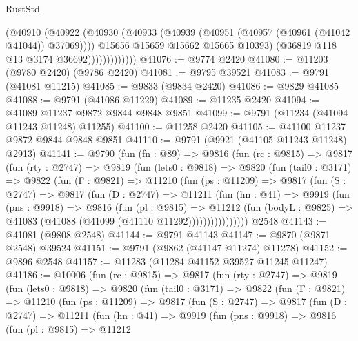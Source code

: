 \begin{lexlean}{RustStd}
\begin{coremodule}
                        (@40910
                          (@40922
                            (@40930
                              (@40933 (@40939 (@40951 (@40957 (@40961 (@41042 @41044)) @37069))))
                              @15656
                              @15659
                              @15662
                              @15665
                              @10393)
                            (@36819 @118 @13 @3174 @36692)))))))))))))
@41076 := @9774 @2420
@41080 := @11203 (@9780 @2420) (@9786 @2420)
@41081 := @9795 @39521
@41083 := @9791 (@41081 @11215)
@41085 := @9833 (@9834 @2420)
@41086 := @9829 @41085
@41088 := @9791 (@41086 @11229)
@41089 := @11235 @2420
@41094 := @41089 @11237 @9872 @9844 @9848 @9851
@41099 := @9791 (@11234 (@41094 @11243 @11248) @11255)
@41100 := @11258 @2420
@41105 := @41100 @11237 @9872 @9844 @9848 @9851
@41110 := @9791 (@9921 (@41105 @11243 @11248) @2913)
@41141 := @9790
    (fun (fn : @89) =>
    @9816
      (fun (rc : @9815) =>
      @9817
        (fun (rty : @2747) =>
        @9819
          (fun (lets0 : @9818) =>
          @9820
            (fun (tail0 : @3171) =>
            @9822
              (fun (Γ : @9821) =>
              @11210
                (fun (ps : @11209) =>
                @9817
                  (fun (S : @2747) =>
                  @9817
                    (fun (D : @2747) =>
                    @11211
                      (fun (hn : @41) =>
                      @9919
                        (fun (pns : @9918) =>
                        @9816
                          (fun (pl : @9815) =>
                          @11212
                            (fun (bodyL : @9825) =>
                            @41083 (@41088 (@41099 (@41110 @11292))))))))))))))))
    @2548
@41143 := @41081 (@9808 @2548)
@41144 := @9791 @41143
@41147 := @9870 (@9871 @2548) @39524
@41151 := @9791 (@9862 (@41147 @11274) @11278)
@41152 := @9896 @2548
@41157 := @11283 (@11284 @41152 @39527 @11245 @11247)
@41186 := @10006
    (fun (rc : @9815) =>
    @9817
      (fun (rty : @2747) =>
      @9819
        (fun (lets0 : @9818) =>
        @9820
          (fun (tail0 : @3171) =>
          @9822
            (fun (Γ : @9821) =>
            @11210
              (fun (ps : @11209) =>
              @9817
                (fun (S : @2747) =>
                @9817
                  (fun (D : @2747) =>
                  @11211
                    (fun (hn : @41) =>
                    @9919
                      (fun (pns : @9918) =>
                      @9816
                        (fun (pl : @9815) =>
                        @11212

\end{coremodule}
\end{lexlean}
